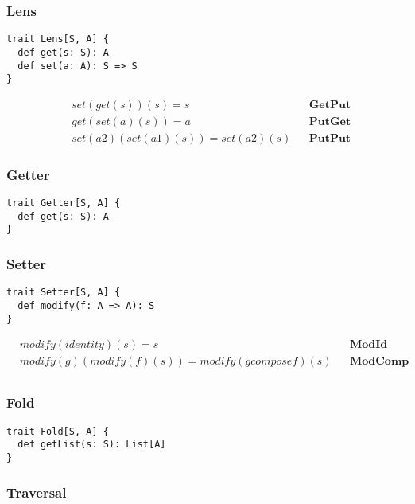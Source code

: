 \documentclass[a4paper]{article}
\begin{document}
\subsubsection{Lens}
\label{subsub: background.optics.lens}

\begin{lstlisting}
trait Lens[S, A] {
  def get(s: S): A
  def set(a: A): S => S
}
\end{lstlisting}

\begin{align*}
  & set(get(s))(s) = s &&\textbf{GetPut} \\
  & get(set(a)(s)) = a &&\textbf{PutGet} \\
  & set(a2)(set(a1)(s)) = set(a2)(s) &&\textbf{PutPut}
\end{align*}

\subsubsection{Getter}

\begin{lstlisting}
trait Getter[S, A] {
  def get(s: S): A
}
\end{lstlisting}

\subsubsection{Setter}

\begin{lstlisting}
trait Setter[S, A] {
  def modify(f: A => A): S
}
\end{lstlisting}

\begin{align*}
  & modify(identity)(s) = s &&\textbf{ModId} \\
  & modify(g)(modify(f)(s)) = modify(g compose f)(s) &&\textbf{ModComp} \\
\end{align*}

\subsubsection{Fold}

\begin{lstlisting}
trait Fold[S, A] {
  def getList(s: S): List[A]
}
\end{lstlisting}

\subsubsection{Traversal}
\end{document}
